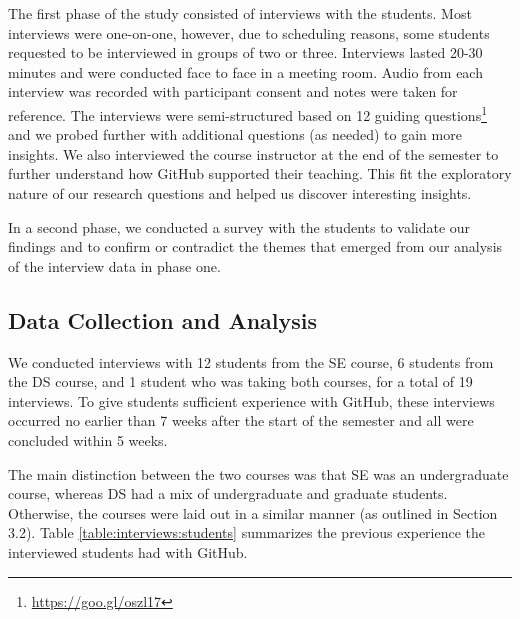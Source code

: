 The first phase of the study consisted of interviews with the students. Most interviews were one-on-one, however, due to scheduling reasons, some students requested to be interviewed in groups of two or three. Interviews lasted 20-30 minutes and were conducted face to face in a meeting room. Audio from each interview was recorded with participant consent and notes were taken for reference. The interviews were semi-structured based on 12 guiding questions\footnote{\url{https://goo.gl/oszl17}} and we probed further with additional questions (as needed) to gain more insights. We also interviewed the course instructor at the end of the semester to further understand how GitHub supported their teaching. This fit the exploratory nature of our research questions and helped us discover interesting insights.


In a second phase, we conducted a survey with the students to validate our findings and to confirm or contradict the themes that emerged from our analysis of the interview data in phase one.

\subsection{Data Collection and Analysis}
We conducted interviews with 12 students from the SE course, 6 students from the DS course, and 1 student who was taking both courses, for a total of 19 interviews.
To give students sufficient experience with GitHub, these interviews occurred no earlier than 7 weeks after the start of the semester and all were concluded within 5 weeks.

 The main distinction between the two courses was that SE was an undergraduate course, whereas DS had a mix of undergraduate and graduate students. Otherwise, the courses were laid out in a similar manner (as outlined in Section 3.2). Table \ref{table:interviews:students} summarizes the previous experience the interviewed students had with GitHub.

